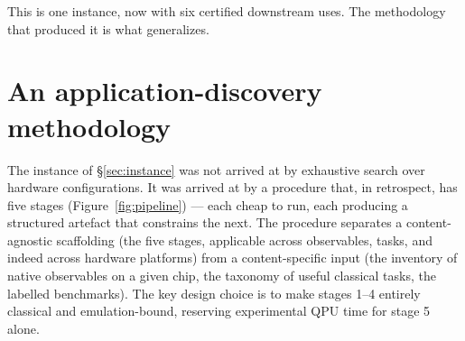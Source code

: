 \documentclass[10pt]{article}
\begin{document}
This is one instance, now with six certified downstream uses. The methodology that produced it is what generalizes.

\section{An application-discovery methodology}\label{sec:method}

The instance of \S\ref{sec:instance} was not arrived at by exhaustive search over hardware configurations. It was arrived at by a procedure that, in retrospect, has five stages (Figure~\ref{fig:pipeline}) --- each cheap to run, each producing a structured artefact that constrains the next. The procedure separates a content-agnostic scaffolding (the five stages, applicable across observables, tasks, and indeed across hardware platforms) from a content-specific input (the inventory of native observables on a given chip, the taxonomy of useful classical tasks, the labelled benchmarks). The key design choice is to make stages 1--4 entirely classical and emulation-bound, reserving experimental QPU time for stage 5 alone.
\end{document}
